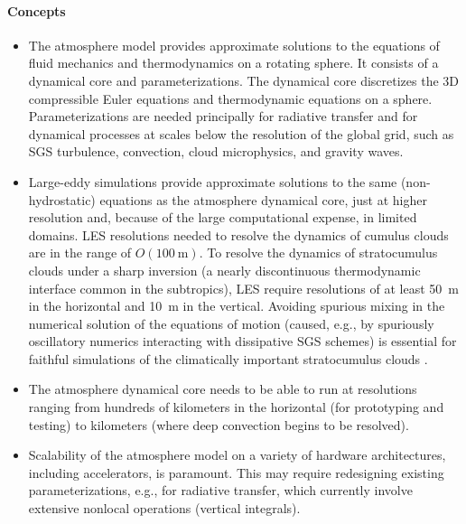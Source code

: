 \documentclass{article}
\begin{document}
\paragraph{Concepts}
\begin{itemize}
    \item The atmosphere model provides approximate solutions to the equations of fluid mechanics and thermodynamics on a rotating sphere. It consists of a dynamical core and parameterizations. The dynamical core discretizes the 3D compressible Euler equations and thermodynamic equations on a sphere. Parameterizations are needed principally for radiative transfer and for dynamical processes at scales below the resolution of the global grid, such as SGS turbulence, convection, cloud microphysics, and gravity waves.
    \item Large-eddy simulations provide approximate solutions to the same (non-hydro\-static) equations as the atmosphere dynamical core, just at higher resolution and, because of the large computational expense, in limited domains. LES resolutions needed to resolve the dynamics of cumulus clouds are in the range of $O(100~\mathrm{m})$. To resolve the dynamics of stratocumulus clouds under a sharp inversion (a nearly discontinuous thermodynamic interface common in the subtropics), LES require resolutions of at least 50~m in the horizontal and 10~m in the vertical. Avoiding spurious mixing in the numerical solution of the equations of motion (caused, e.g., by spuriously oscillatory numerics interacting with dissipative SGS schemes) is essential for faithful simulations of the climatically important stratocumulus clouds \citep{Pressel17a}.
    \item The atmosphere dynamical core needs to be able to run at resolutions ranging from hundreds of kilometers in the horizontal (for prototyping and testing) to kilometers (where deep convection begins to be resolved).
    \item Scalability of the atmosphere model on a variety of hardware architectures, including accelerators, is paramount. This may require redesigning existing parameterizations, e.g., for radiative transfer, which currently involve extensive nonlocal operations (vertical integrals). 

\end{itemize}
\end{document}
